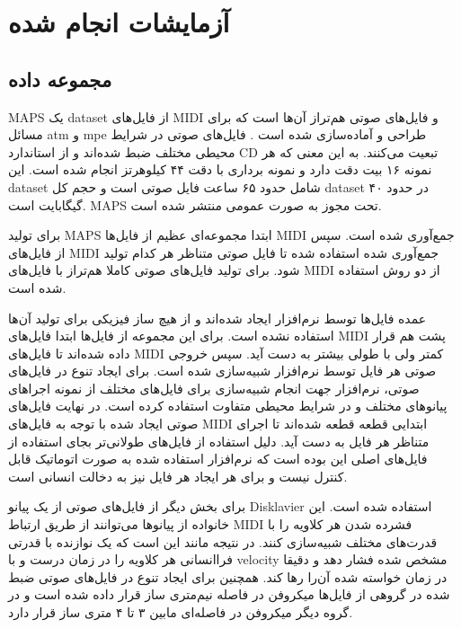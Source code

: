 \chapter{آزمایشات انجام شده}
\section{مجموعه داده}
MAPS یک \gls{dataset} از فایل‌های \gls{MIDI} و فایل‌های صوتی هم‌تراز آن‌ها است
که برای مسائل \gls{atm} و \gls{mpe} طراحی و آماده‌سازی شده است
\cite{emiya2009multipitch}. فایل‌های صوتی در شرایط محیطی مختلف ضبط شده‌اند و از
استاندارد CD تبعیت می‌کنند. به این معنی که هر نمونه ۱۶ بیت دقت دارد و نمونه
برداری با دقت ۴۴ کیلوهرتز انجام شده است. این \gls{dataset} شامل حدود ۶۵ ساعت
فایل صوتی است و حجم کل \gls{dataset} در حدود ۴۰ گیگابایت است. MAPS تحت مجوز
 به صورت عمومی منتشر شده است.

برای تولید MAPS ابتدا مجموعه‌ای عظیم از فایل‌ها \gls{MIDI} جمع‌آوری شده است. سپس
از فایل‌های \gls{MIDI} جمع‌آوری شده استفاده شده تا فایل صوتی متناظر هر کدام
تولید شود. برای تولید فایل‌های صوتی کاملا هم‌تراز با فایل‌های \gls{MIDI} از دو
روش استفاده شده است.

عمده فایل‌ها توسط نرم‌افزار ایجاد شده‌اند و از هیچ ساز فیزیکی برای تولید آن‌ها
استفاده نشده است. برای این مجموعه از فایل‌ها ابتدا فایل‌های \gls{MIDI} پشت هم
قرار داده شده‌اند تا فایل‌های \gls{MIDI} کمتر ولی با طولی بیشتر به دست آید. سپس
خروجی صوتی هر فایل توسط نرم‌افزار  شبیه‌سازی شده است.
برای ایجاد تنوع در فایل‌های صوتی، نرم‌افزار جهت انجام شبیه‌سازی برای فایل‌های
مختلف از نمونه اجراهای پیانوهای مختلف و در شرایط محیطی متفاوت استفاده کرده است.
در نهایت فایل‌های صوتی ایجاد شده با توجه به فایل‌های \gls{MIDI} ابتدایی قطعه
قطعه شده‌اند تا اجرای متناظر هر فایل به دست آید. دلیل استفاده از فایل‌های
طولانی‌تر بجای استفاده از فایل‌های اصلی این بوده است که نرم‌افزار استفاده شده به
صورت اتوماتیک قابل کنترل نیست و برای هر ایجاد هر فایل نیز به دخالت انسانی است.

برای بخش دیگر از فایل‌های صوتی از یک پیانو Disklavier استفاده شده است. این
خانواده از پیانوها می‌توانند از طریق ارتباط \gls{MIDI} فشرده شدن هر کلاویه را با
قدرت‌های مختلف شبیه‌سازی کنند. در نتیجه مانند این است که یک نوازنده با قدرتی
فراانسانی هر کلاویه را در زمان درست و با \gls{velocity} مشخص شده فشار دهد و
دقیقا در زمان خواسته شده آن‌را رها کند. همچنین برای ایجاد تنوع در فایل‌های صوتی
ضبط شده در گروهی از فایل‌ها میکروفن در فاصله نیم‌متری ساز قرار داده شده است و در
گروه دیگر میکروفن در فاصله‌ای مابین ۳ تا ۴ متری ساز قرار دارد.

